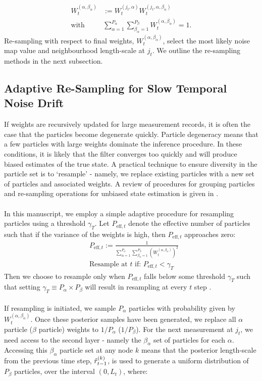 \begin{align}
W_t^{(\alpha, \beta_\alpha)} &:= W_t^{(j_t, \alpha)}  W_t^{(j_t, \alpha, \beta_\alpha)} \\
\mathrm{with} \quad & \sum_{\alpha=1}^{P_\alpha} \sum_{\beta_\alpha=1}^{P_\beta}  W_t^{(\alpha, \beta_\alpha)} = 1.
\end{align} Re-sampling with respect to final weights, $W_t^{(\alpha, \beta_\alpha)}$, select the most likely noise map value and neighbourhood length-scale at $j_t$. We outline the re-sampling methods in the next subsection. 

\subsection{Adaptive Re-Sampling for Slow Temporal Noise Drift}
If weights are recursively updated for large measurement records, it is often the case that the particles become degenerate quickly. Particle degeneracy means that a few particles with large weights dominate the inference procedure. In these conditions, it is likely that the filter converges too quickly and will produce biased estimates of the true state. A practical technique to ensure diversity in the particle set is to `resample' - namely, we replace existing particles with a new set of particles and associated weights. A review of procedures for grouping particles and re-sampling operations for unbiased state estimation is given in \cite{li2015resampling}.\\
\\
In this manuscript, we employ a simple adaptive procedure for resampling particles using a threshold $\gamma_{T}$. Let $P_{\mathrm{eff},t}$ denote the effective number of particles such that if the variance of the weights is high, then $P_{\mathrm{eff},t}$ approaches zero:
\begin{align}
& P_{\mathrm{eff},t} := \frac{1}{\sum_{\alpha=1}^{P_\alpha} \sum_{\beta_\alpha=1}^{P_\beta} \left( W_t^{(\alpha, \beta_\alpha)} \right)^2} \\
&\textrm{Resample at $t$ if:  }  P_{\mathrm{eff},t} < \gamma_{T} 
\end{align}Then we choose to resample only when $P_{\mathrm{eff},t}$ falls below some threshold $\gamma_{T}$ such that setting $\gamma_{T} \equiv P_\alpha \times P_\beta$ will result in resampling at every $t$ step \cite{li2015resampling}.\\
\\
If resampling is initiated, we sample $P_\alpha$ particles with probability given by $ W_t^{(\alpha, \beta_\alpha)}$. Once these posterior samples have been generated, we replace all $\alpha$ particle ($\beta$ particle) weights to $1 / P_\alpha$ ($1 / P_\beta$). For the next measurement at $j_t$, we need access to the second layer - namely the $\beta_\alpha$ set of particles for each $\alpha$.  Accessing this $\beta_\alpha$ particle set at any node $k$ means that the posterior length-scale from the previous time step, $\hat{r}^{( k )}_{t-1}$, is used to generate a uniform distribution of  $P_\beta$ particles, over the interval $(0, L_t)$, where:
